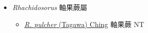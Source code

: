 
  \begin{itemize}
 \item[    ] \textit{Rhachidosorus} 軸果蕨屬
                                
  \begin{itemize}
        \item[] \href{http://www.theplantlist.org/tpl1.1/search?q=Rhachidosorus+pulcher}{\textit{R. pulcher} (Tagawa) Ching}   軸果蕨   NT
  \end{itemize}
  \end{itemize}
